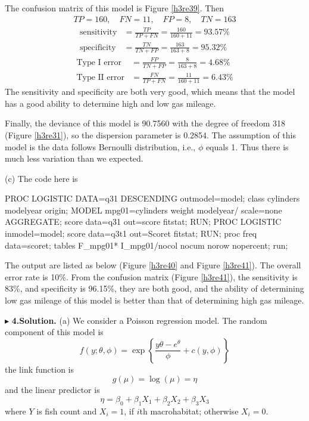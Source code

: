 \documentclass[letterpaper, 12pt]{article}
\newcommand{\ba}{$$\begin{aligned}}
\newcommand{\ea}{\end{aligned}$$}
\begin{document}
The confusion matrix of this model is Figure \ref{h3re39}. Then
\ba
TP=160,\quad FN=11,\quad FP=8,\quad TN=163
\ea
\ba
\text{sensitivity}&=\frac{TP}{TP+FN}=\frac{160}{160+11}=93.57\%\\
\text{specificity}&=\frac{TN}{TN+FP}=\frac{163}{163+8}=95.32\%
\ea
\ba
\text{Type I error}&=\frac{FP}{TN+FP}=\frac{8}{163+8}=4.68\%\\
\text{Type II error}&=\frac{FN}{TP+FN}=\frac{11}{160+11}=6.43\%
\ea
The sensitivity and specificity are both very good, which means that the model has a good ability to determine high and low gas mileage.


Finally, the deviance of this model is 90.7560 with the degree of freedom 318 (Figure \ref{h3re31}), so the dispersion parameter is 0.2854. The assumption of this model is the data follows Bernoulli distribution, i.e., $\phi$ equals 1. Thus there is much less variation than we expected.

(c) The code here is 
\begin{Sascode}[store=class]
PROC LOGISTIC DATA=q31 DESCENDING outmodel=model;
class cylinders modelyear origin;
MODEL mpg01=cylinders weight modelyear/ scale=none AGGREGATE;
score data=q31 out=score fitstat;
RUN;
PROC LOGISTIC inmodel=model;
score data=q3t1 out=Scoret fitstat;
RUN;
proc freq data=scoret;
tables F_mpg01* I_mpg01/nocol nocum norow nopercent;
run;
\end{Sascode}

The output are listed as below (Figure \ref{h3re40} and Figure \ref{h3re41}). The overall error rate is 10\%. From the confusion matrix (Figure \ref{h3re41}), the sensitivity is 83\%, and specificity is 96.15\%, they are both good, and the ability of determining low gas mileage of this model is better than that of determining high gas mileage.



$\blacktriangleright$ \textbf{4.\quad Solution.} 
(a) We consider a Poisson regression model. The random component of this model is 
$$
f(y;\theta,\phi)=\exp\left\{\frac{y\theta-e^\theta}{\phi}+c(y,\phi)\right\}
$$
the link function is 
$$
g(\mu)=\log(\mu)=\eta
$$
and the linear predictor is
$$
\eta=\beta_0+\beta_1X_1+\beta_2X_2+\beta_3X_3
$$
where $Y$ is fish count and $X_{i}=1$, if $i$th macrohabitat; otherwise $X_{i}=0$. 
\end{document}
